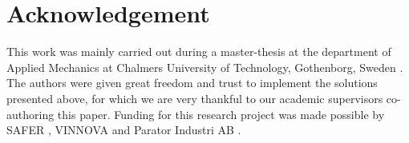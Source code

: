 \documentclass[root.tex]{subfiles}
\begin{document}
{\pagestyle{empty}}
\section{Acknowledgement}
\label{chap:Acknowledgement}
This work was mainly carried out during a master-thesis at the department of Applied Mechanics at Chalmers University of Technology, Gothenborg, Sweden \cite{franzreal}. The authors were given great freedom and trust to implement the solutions presented above, for which we are very thankful to our academic supervisors co-authoring this paper. Funding for this research project was made possible by SAFER \cite{safer}, VINNOVA \cite{vinnova} and Parator Industri AB \cite{paratorAB}.
\end{document}
